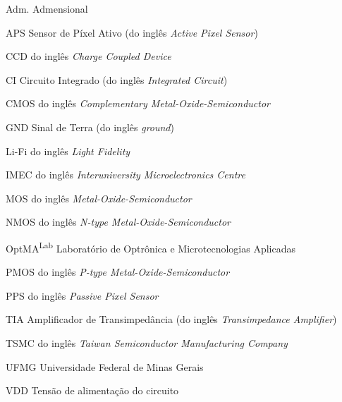 \begin{siglas}
  
  \item[Adm.] Admensional
  \item[APS] Sensor de Píxel Ativo (do inglês \textit{Active Pixel Sensor})
  \item[CCD] do inglês \textit{Charge Coupled Device}
  \item[CI] Circuito Integrado (do inglês  \textit{Integrated Circuit})
  \item[CMOS] do inglês \textit{Complementary Metal-Oxide-Semiconductor}
  \item[GND] Sinal de Terra (do inglês \textit{ground})
  \item[Li-Fi] do inglês \textit{Light Fidelity}
  \item[IMEC] do inglês \textit{Interuniversity Microelectronics Centre}
  \item[MOS] do inglês \textit{Metal-Oxide-Semiconductor}
  \item[NMOS] do inglês \textit{N-type Metal-Oxide-Semiconductor}
  \item[OptMA\textsuperscript{Lab}] Laboratório de Optrônica e Microtecnologias Aplicadas
  \item[PMOS] do inglês \textit{P-type Metal-Oxide-Semiconductor}
  \item[PPS] do inglês \textit{Passive Pixel Sensor}
  \item[TIA] Amplificador de Transimpedância (do inglês \textit{Transimpedance Amplifier})
  \item[TSMC] do inglês \textit{Taiwan Semiconductor Manufacturing Company}
  \item[UFMG] Universidade Federal de Minas Gerais
  \item[VDD] Tensão de alimentação do circuito
 
\end{siglas}
